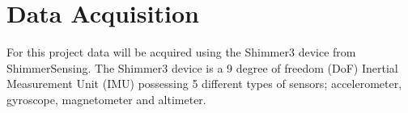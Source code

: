 \section{Data Acquisition}

For this project data will be acquired using the Shimmer3 device from ShimmerSensing. The Shimmer3 device is a 9 degree of freedom (DoF) Inertial Measurement Unit (IMU) possessing 5 different types of sensors; accelerometer, gyroscope, magnetometer and altimeter. 